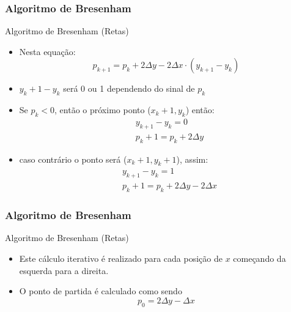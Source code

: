 \documentclass{beamer}
\begin{document}
\begin{frame}
\frametitle{Algoritmo de Bresenham}
		\begin{block}{Algoritmo de Bresenham (Retas)}
		\begin{itemize}
			\item Nesta equação:
				\begin{equation*}
					p_{k+1} = p_k + 2 \Delta y - 2 \Delta x \cdot (y_{k+1} - y_k)
				\end{equation*}
			\item $y_k+1-y_k$ será 0 ou 1 dependendo do sinal de $p_k$
			\item Se $p_k < 0$, então o próximo ponto ($x_k+1,y_k$) então:
			\begin{align*}
				& y_{k+1}-y_k = 0\\
				& p_k+1 = p_k + 2 \Delta y
			\end{align*}
			\item caso contrário o ponto será ($x_k+1,y_k+1$), assim:
			\begin{align*}
				& y_{k+1}-y_k = 1\\
				& p_k+1 = p_k + 2 \Delta y - 2 \Delta x
			\end{align*}
		\end{itemize}
	\end{block}
\end{frame}

\begin{frame}
\frametitle{Algoritmo de Bresenham}
		\begin{block}{Algoritmo de Bresenham (Retas)}
		\begin{itemize}
			\item Este cálculo iterativo é realizado para cada posição de $x$ começando da esquerda para a direita.
			\item O ponto de partida é calculado como sendo
				\begin{equation*}
					p_0 = 2 \Delta y - \Delta x
				\end{equation*}
		\end{itemize}
	\end{block}
\end{frame}
\end{document}
